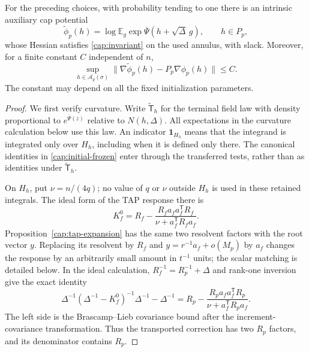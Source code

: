 \begin{proposition}\label{cap:auxiliary-initialization}
For the preceding choices, with probability tending to one there is
an intrinsic auxiliary cap potential
\[
 \widetilde\phi_p(h)=
 \log\mathbb E_g\exp\overline\Psi(h+\sqrt\Delta\,g),
 \qquad h\in P_p,
\]
whose Hessian satisfies \eqref{cap:invariant} on the used annulus,
with slack.  Moreover, for a finite constant $C$ independent of $n$,
\begin{equation}\label{cap:initial-gradient-error}
 \sup_{h\in\mathcal A_p(\sigma)}
 \|\nabla\widetilde\phi_p(h)-P_p\nabla\phi_p(h)\|\le C.
\end{equation}
The constant may depend on all the fixed initialization parameters.
\end{proposition}

\begin{proof}
We first verify curvature. Write $\widetilde{\mathsf T}_h$ for the terminal
field law with density proportional to $e^{\overline\Psi(z)}$ relative to
$N(h,\Delta)$. All expectations in the curvature calculation below use this
law. An indicator $\mathbf1_{H_h}$ means that the integrand is integrated only
over $H_h$, including when it is defined only there. The canonical identities
in \eqref{cap:initial-frozen} enter through
the transferred tests, rather than as identities under
$\widetilde{\mathsf T}_h$.

On $H_h$, put $\nu=n/(4q)$; no value of $q$ or $\nu$ outside $H_h$ is used
in these retained integrals. The ideal form of the TAP response there is
\[
 K_f^0=R_f-\frac{R_fa_fa_f^{\mathsf T}R_f}
                    {\nu+a_f^{\mathsf T}R_fa_f}.
\]
Proposition~\ref{cap:tap-expansion} has the same two resolvent factors with
the root vector $y$. Replacing its resolvent by $R_f$ and
$y=r^{-1}a_f+o(M_p)$ by $a_f$ changes the response by an arbitrarily small
amount in $t^{-1}$ units; the scalar matching is detailed below. In the
ideal calculation, $R_f^{-1}=R_p^{-1}+\Delta$ and rank-one inversion give
the exact identity
\begin{equation}\label{cap:initial-rank-transport}
 \Delta^{-1}(\Delta^{-1}-K_f^0)^{-1}\Delta^{-1}-\Delta^{-1}
 =R_p-\frac{R_pa_fa_f^{\mathsf T}R_p}
              {\nu+a_f^{\mathsf T}R_pa_f}.
\end{equation}
The left side is the Brascamp--Lieb covariance bound after the
increment-covariance transformation. Thus the transported correction has
two $R_p$ factors, and its denominator contains $R_p$.


\end{proof}
